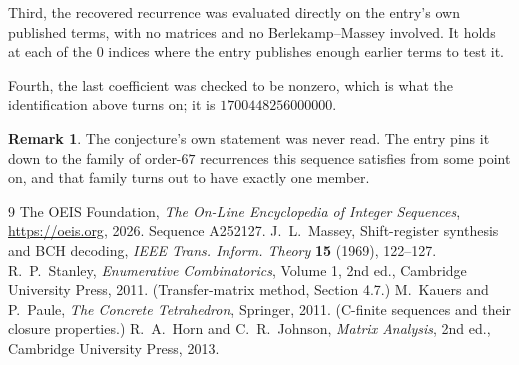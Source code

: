 \documentclass[11pt,a4paper]{article}
\theoremstyle{plain}
\theoremstyle{definition}
\newtheorem{remark}[theorem]{Remark}
\begin{document}
Third, the recovered recurrence was evaluated directly on the entry's own published terms, with
no matrices and no Berlekamp--Massey involved. It holds at each of the $0$ indices where
the entry publishes enough earlier terms to test it.

Fourth, the last coefficient was checked to be nonzero, which is what the identification above
turns on; it is $1700448256000000$.

\begin{remark}
The conjecture's own statement was never read. The entry pins it down to the family of
order-$67$ recurrences this sequence satisfies from some point on, and that family turns
out to have exactly one member.
\end{remark}

\begin{thebibliography}{9}
 The OEIS Foundation, \emph{The On-Line Encyclopedia of Integer
Sequences}, \url{https://oeis.org}, 2026. Sequence A252127.
 J.~L.~Massey, Shift-register synthesis and BCH decoding, \emph{IEEE
Trans. Inform. Theory} \textbf{15} (1969), 122--127.
 R.~P.~Stanley, \emph{Enumerative Combinatorics}, Volume 1, 2nd ed.,
Cambridge University Press, 2011. (Transfer-matrix method, Section 4.7.)
 M.~Kauers and P.~Paule, \emph{The Concrete Tetrahedron}, Springer, 2011.
(C-finite sequences and their closure properties.)
 R.~A.~Horn and C.~R.~Johnson, \emph{Matrix Analysis}, 2nd ed., Cambridge
University Press, 2013.
\end{thebibliography}
\end{document}

